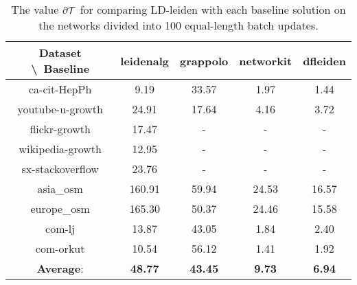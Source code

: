 \begin{table}[H]
	\centering
	\begin{tabular}{|c|c|c|c|c|}
		\hline
		Dataset \textbackslash\ Baseline & leidenalg & grappolo & networkit & dfleiden \\
		\hline
		ca-cit-HepPh & 9.19 & 33.57 & 1.97 & 1.44 \\
		\hline
		youtube-u-growth & 24.91 & 17.64 & 4.16 & 3.72 \\
		\hline
		flickr-growth & 17.47 & - & - & - \\
		\hline
		wikipedia-growth & 12.95 & - & - & - \\
		\hline
		sx-stackoverflow & 23.76 & - & - & - \\
		\hline
		asia\_osm & 160.91 & 59.94 & 24.53 & 16.57 \\
		\hline
		europe\_osm & 165.30 & 50.37 & 24.46 & 15.58 \\
		\hline
		com-lj & 13.87 & 43.05 & 1.84 & 2.40 \\
		\hline
		com-orkut & 10.54 & 56.12 & 1.41 & 1.92 \\
		\hline
		\textbf{Average}: & \textbf{48.77} & \textbf{43.45} & \textbf{9.73} & \textbf{6.94} \\
		\hline
	\end{tabular}
\caption{The value $\partial\mathcal{T}$ for comparing LD-leiden with each baseline solution on the networks divided into 100 equal-length batch updates.}
\label{T:ameanT:100 batches}
\end{table}
